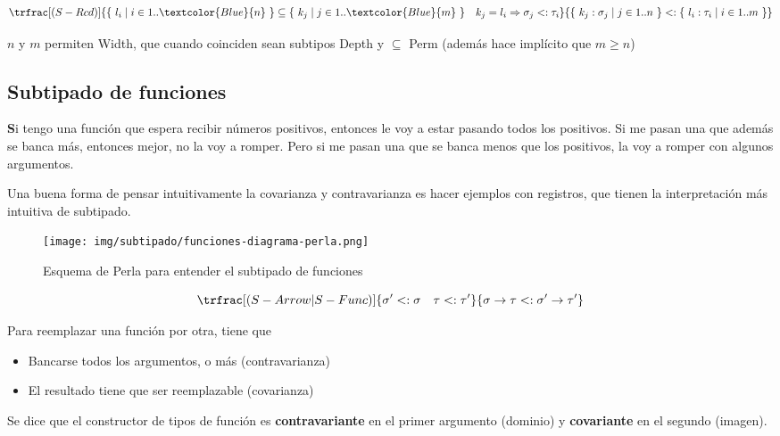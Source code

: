 \documentclass{report}
\theoremstyle{definition} %
\newenvironment{nota}[1]
    {\begin{leftbar}\textbf{#1}}
    {\end{leftbar}}
\newcommand{\tfunc}[2]{#1 \to #2}
\newcommand{\reg}[1]{\{\ #1\ \}}
\newcommand{\deriv}[3]{\trfrac[(#1)]{#2}{#3}}
\newcommand{\select}[1]{\textcolor{Blue}{#1}}
\newcommand{\subt}[2]{#1 <: #2}
\begin{document}
\[
    \deriv{S-Rcd}
        {
            \reg{l_i \mid i\in 1..\select{n}}
            \subseteq
            \reg{k_j \mid j \in 1.. \select{m}}
            \quad
            k_j = l_i \Rightarrow \subt{\sigma_j}{\tau_i}
        }
        {
            \subt
                {\reg{k_j : \sigma_j \mid j \in 1..n}}
                {\reg{l_i : \tau_i \mid i \in 1..m}}
        }
\]

$n$ y $m$ permiten Width, que cuando coinciden sean subtipos Depth y $\subseteq$
Perm (además hace implícito que $m \geq n$) 

\subsection{Subtipado de funciones}

\begin{nota}
    Si tengo una función que espera recibir números positivos, entonces le voy a
    estar pasando todos los positivos. Si me pasan una que además se banca más,
    entonces mejor, no la voy a romper. Pero si me pasan una que se banca menos
    que los positivos, la voy a romper con algunos argumentos.

    Una buena forma de pensar intuitivamente la covarianza y contravarianza es
    hacer ejemplos con registros, que tienen la interpretación más intuitiva de
    subtipado.
\end{nota}

\begin{figure}[H]
    \centering
    \texttt{[image: img/subtipado/funciones-diagrama-perla.png]}
    \caption{Esquema de Perla para entender el subtipado de funciones}
\end{figure}


\[
    \deriv{S-Arrow | S-Func}
        {\subt{\sigma'}{\sigma} \quad \subt{\tau}{\tau'}}
        {\subt
            {\tfunc{\sigma}{\tau}}
            {\tfunc{\sigma'}{\tau'}}
        }
\]

Para reemplazar una función por otra, tiene que
\begin{itemize}
    \item Bancarse todos los argumentos, o más (contravarianza)
    \item El resultado tiene que ser reemplazable (covarianza)
\end{itemize}

Se dice que el constructor de tipos de función es \textbf{contravariante} en el
primer argumento (dominio) y \textbf{covariante} en el segundo (imagen).
\end{document}
